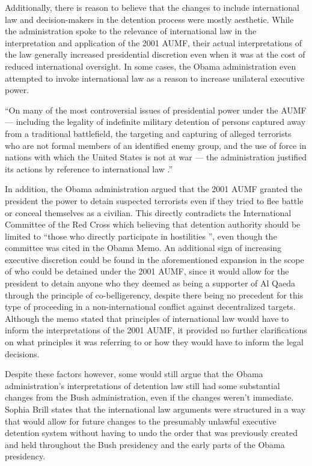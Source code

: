 \documentclass[12pt]{article}
\begin{document}
Additionally, there is reason to believe that the changes to include international law and decision-makers in the detention process were mostly aesthetic.
While the administration spoke to the relevance of international law in the interpretation and application of the 2001 AUMF, their actual interpretations of the law generally increased presidential discretion even when it was at the cost of reduced international oversight.
In some cases, the Obama administration even attempted to invoke international law as a reason to increase unilateral executive power.

\begin{displayquote}
``On many of the most controversial issues of presidential power under the AUMF — including the legality of indefinite military detention of persons captured away from a traditional battlefield, the targeting and capturing of alleged terrorists who are not formal members of an identified enemy group, and the use of force in nations with which the United States is not at war — the administration justified its actions by reference to international law \autocite[639]{bradley2016}.''
\end{displayquote}

\noindent
In addition, the Obama administration argued that the 2001 AUMF granted the president the power to detain suspected terrorists even if they tried to flee battle or conceal themselves as a civilian.
This directly contradicts the International Committee of the Red Cross which believing that detention authority should be limited to ``those who directly participate in hostilities \autocite[639]{bradley2016}'', even though the committee was cited in the Obama Memo.
An additional sign of increasing executive discretion could be found in the aforementioned expansion in the scope of who could be detained under the 2001 AUMF, since it would allow for the president to detain anyone who they deemed as being a supporter of Al Qaeda through the principle of co-belligerency, despite there being no precedent for this type of proceeding in a non-international conflict against decentralized targets.
Although the memo stated that principles of international law would have to inform the interpretations of the 2001 AUMF, it provided no further clarifications on what principles it was referring to or how they would have to inform the legal decisions. 

Despite these factors however, some would still argue that the Obama administration's interpretations of detention law still had some substantial changes from the Bush administration, even if the changes weren't immediate.
Sophia Brill states that the international law arguments were structured in a way that would allow for future changes to the presumably unlawful executive detention system without having to undo the order that was previously created and held throughout the Bush presidency and the early parts of the Obama presidency.
\end{document}
